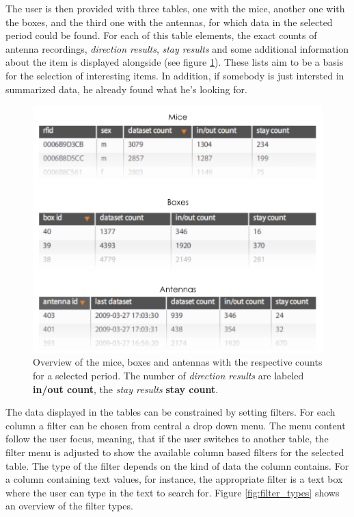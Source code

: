 The user is then provided with three tables, one with the mice, another one with the boxes, and the third one with the antennas, for which data in the selected period could be found. For each of this table elements, the exact counts of antenna recordings, \textit{direction results}, \textit{stay results} and some additional information about the item is displayed alongside (see figure \ref{fig:data_overview_with_count}). These lists aim to be a basis for the selection of interesting items. In addition, if somebody is just intersted in summarized data, he already found what he's looking for. 

\begin{figure}[htpb]
\begin{center}
  \includegraphics[width=.75\textwidth]{assets/pdf/overview_list.pdf}
  \caption[Overview of the data within a date period]{Overview of the mice, boxes and antennas with the respective counts for a selected period. The number of \textit{direction results} are labeled \textbf{in/out count}, the \textit{stay results}  \textbf{stay count}.}
  \label{fig:data_overview_with_count}
\end{center}
\end{figure}

The data displayed in the tables can be constrained by setting filters. For each column a filter can be chosen from central a drop down menu. The menu content follow the user focus, meaning, that if the user switches to another table, the filter menu is adjusted to show the available column based filters for the selected table. The type of the filter depends on the kind of data the column contains. For a column containing text values, for instance, the appropriate filter is a text box where the user can type in the text to search for. Figure \ref{fig:filter_types} shows an overview of the filter types.

